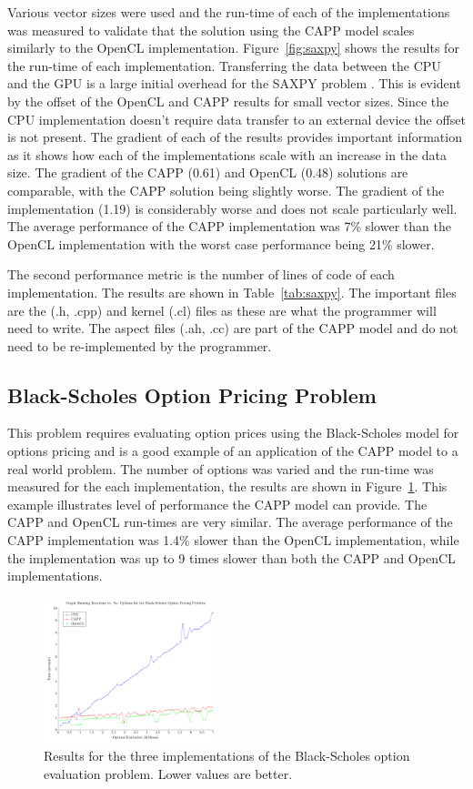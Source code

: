 \documentclass{sig-alternate-05-2015}
\begin{document}
Various vector sizes were used and the run-time of each of the implementations
was measured to validate that the solution using the
CAPP model scales similarly to the OpenCL implementation. Figure~\ref{fig:saxpy} 
shows the results for the run-time of each implementation. Transferring
the data between the CPU and the GPU is a large initial overhead for the SAXPY problem
\cite{gregg:saxpy}. This is evident by the offset of the
OpenCL and CAPP results for small vector sizes. Since the CPU implementation
doesn't require data transfer to an external device the offset is not present.
The gradient of each of the results provides important information as it shows
how each of the implementations scale with an increase in the data size. 
The gradient of the CAPP (0.61) and OpenCL (0.48) solutions are comparable, with
the CAPP solution being slightly worse. The gradient of the \CPP
implementation (1.19) is considerably worse and does not scale particularly
well. The average performance of the CAPP implementation was 7\% slower
than the OpenCL implementation with the worst case performance being 21\%
slower.

The second performance metric is the number of lines
of code of each implementation. The results are shown in 
Table~\ref{tab:saxpy}. The important files are the \CPP (.h, .cpp) and kernel (.cl)
files as these are what the programmer will need to write. The aspect files (.ah, .cc) are
part of the CAPP model and do not need to be re-implemented by the programmer. 

\subsection{Black-Scholes Option Pricing Problem}

This problem requires evaluating option prices using the Black-Scholes 
model for options pricing and is a good example of an application of the CAPP 
model to a real world problem. The number of options was varied and the
run-time was measured for the each implementation, the results are shown in 
Figure~\ref{fig:blackscholes}. 
This example illustrates level of performance the CAPP model can
provide. The CAPP and OpenCL run-times are very similar. The average 
performance of the CAPP implementation was 1.4\% slower than the
OpenCL implementation, while the \CPP implementation was up to 9 times slower
than both the CAPP and OpenCL implementations.

\begin{figure}[!t]
	\centering
	\includegraphics[width=0.45\textwidth]{BlackScholes}
	\caption{Results for the three implementations of the Black-Scholes option
		evaluation problem. Lower values are better.}
	\label{fig:blackscholes}
\end{figure}
\end{document}
